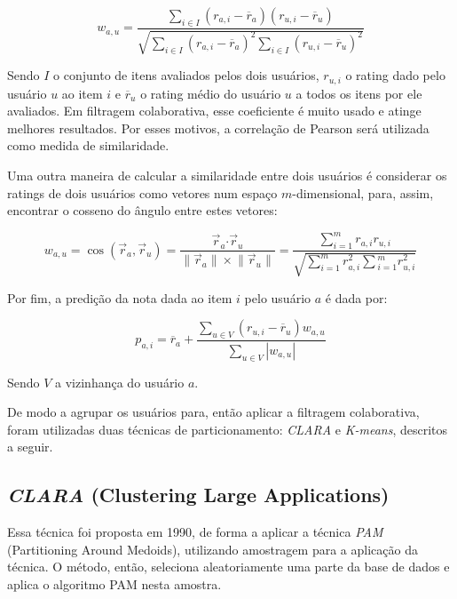 \documentclass[12pt,a4paper,header]{abnt}
\begin{document}
\begin{equation}
w_{a, u} = \frac{\sum_{i \in I}{(r_{a, i} - \overline{r}_a ) ( r_{u, i} - \overline{r}_u )}}{\sqrt{\sum_{i \in I}{(r_{a, i} - \overline{r}_a )^2} \sum_{i \in I}{(r_{u, i} - \overline{r}_u )^2}}}
\end{equation}

Sendo $I$ o conjunto de itens avaliados pelos dois usuários, $r_{u, i}$ o rating dado pelo usuário $u$ ao item $i$ e $\overline{r}_u$ o rating médio do usuário $u$ a todos os itens por ele avaliados. Em filtragem colaborativa, esse coeficiente é muito usado\cite{su2009survey} e atinge melhores resultados\cite{breese1998empirical}. Por esses motivos, a correlação de Pearson será utilizada como medida de similaridade.

Uma outra maneira de calcular a similaridade entre dois usuários é considerar os ratings de dois usuários como vetores num espaço $m$-dimensional, para, assim, encontrar o cosseno do ângulo entre estes vetores\cite{melville2011recommender}:

\begin{equation}
w_{a, u} = \cos({\vec{r}_a, \vec{r}_u}) = \frac{\vec{r}_a \boldsymbol{\cdot} \vec{r}_u}{\lVert \vec{r}_a\rVert \times \lVert \vec{r}_u\rVert} = \frac{\sum_{i=1}^{m}{r_{a, i} r_{u, i}}}{\sqrt{\sum_{i=1}^{m}{r^2_{a, i}} \sum{_{i=1}^{m}{r^2_{u, i}}}}}
\end{equation}

Por fim, a predição da nota dada ao item $i$ pelo usuário $a$ é dada por:

\begin{equation}
p_{a, i} = \overline{r}_a + \frac{\sum_{u \in V}{(r_{u, i} - \overline{r}_u) w_{a, u}}}{\sum_{u \in V}{\left|w_{a, u}\right|}}
\end{equation}

Sendo $V$ a vizinhança do usuário $a$.

De modo a agrupar os usuários para, então aplicar a filtragem colaborativa, foram utilizadas duas técnicas de particionamento: \textit{CLARA} e \textit{K-means}, descritos a seguir.

\subsection{\textit{CLARA} (Clustering Large Applications)}

Essa técnica foi proposta em 1990, de forma a aplicar a técnica \textit{PAM} (Partitioning Around Medoids), utilizando amostragem para a aplicação da técnica\cite{park2009simple}. O método, então, seleciona aleatoriamente uma parte da base de dados e aplica o algoritmo PAM nesta amostra. 
\end{document}
